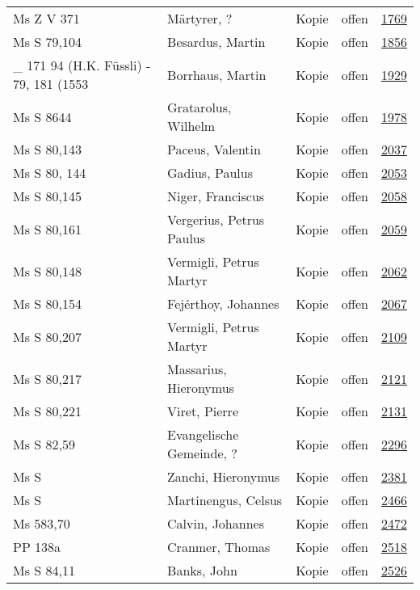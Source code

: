 \documentclass[10pt,a4paper,landscape]{report}
\begin{document}
\begin{longtable}{p{16cm}p{4cm}llr}
Ms Z V 371	&	Märtyrer, ?	&	Kopie	&	offen	&	\href{http://130.60.24.72/assignment/1769}{1769}\\
Ms S 79,104	&	Besardus, Martin	&	Kopie	&	offen	&	\href{http://130.60.24.72/assignment/1856}{1856}\\
\_ 171 94 (H.K. Füssli) - 79, 181 (1553	&	Borrhaus, Martin	&	Kopie	&	offen	&	\href{http://130.60.24.72/assignment/1929}{1929}\\
Ms S 8644	&	Gratarolus, Wilhelm	&	Kopie	&	offen	&	\href{http://130.60.24.72/assignment/1978}{1978}\\
Ms S 80,143	&	Paceus, Valentin	&	Kopie	&	offen	&	\href{http://130.60.24.72/assignment/2037}{2037}\\
Ms S 80, 144	&	Gadius, Paulus	&	Kopie	&	offen	&	\href{http://130.60.24.72/assignment/2053}{2053}\\
Ms S 80,145	&	Niger, Franciscus	&	Kopie	&	offen	&	\href{http://130.60.24.72/assignment/2058}{2058}\\
Ms S 80,161	&	Vergerius, Petrus Paulus	&	Kopie	&	offen	&	\href{http://130.60.24.72/assignment/2059}{2059}\\
Ms S 80,148	&	Vermigli, Petrus Martyr	&	Kopie	&	offen	&	\href{http://130.60.24.72/assignment/2062}{2062}\\
Ms S 80,154	&	Fejérthoy, Johannes	&	Kopie	&	offen	&	\href{http://130.60.24.72/assignment/2067}{2067}\\
Ms S 80,207	&	Vermigli, Petrus Martyr	&	Kopie	&	offen	&	\href{http://130.60.24.72/assignment/2109}{2109}\\
Ms S 80,217	&	Massarius, Hieronymus	&	Kopie	&	offen	&	\href{http://130.60.24.72/assignment/2121}{2121}\\
Ms S 80,221	&	Viret, Pierre	&	Kopie	&	offen	&	\href{http://130.60.24.72/assignment/2131}{2131}\\
Ms S 82,59	&	Evangelische Gemeinde, ?	&	Kopie	&	offen	&	\href{http://130.60.24.72/assignment/2296}{2296}\\
Ms S	&	Zanchi, Hieronymus	&	Kopie	&	offen	&	\href{http://130.60.24.72/assignment/2381}{2381}\\
Ms S	&	Martinengus, Celsus	&	Kopie	&	offen	&	\href{http://130.60.24.72/assignment/2466}{2466}\\
Ms 583,70	&	Calvin, Johannes	&	Kopie	&	offen	&	\href{http://130.60.24.72/assignment/2472}{2472}\\
PP 138a	&	Cranmer, Thomas	&	Kopie	&	offen	&	\href{http://130.60.24.72/assignment/2518}{2518}\\
Ms S 84,11	&	Banks, John	&	Kopie	&	offen	&	\href{http://130.60.24.72/assignment/2526}{2526}\\

\end{longtable}
\end{document}
